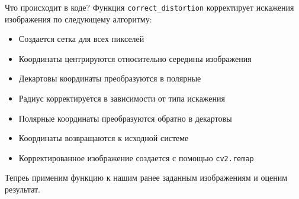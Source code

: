 \documentclass[a4paper,12pt]{article}
\begin{document}
Что происходит в коде? Функция \texttt{correct\_distortion} корректирует искажения изображения по следующему алгоритму:

\begin{itemize}
    \item Создается сетка для всех пикселей
    \item Координаты центрируются относительно середины изображения
    \item Декартовы координаты преобразуются в полярные
    \item Радиус корректируется в зависимости от типа искажения
    \item  Полярные координаты преобразуются обратно в декартовы
    \item Координаты возвращаются к исходной системе
    \item Корректированное изображение создается с помощью \texttt{cv2.remap}
\end{itemize}

Тепреь применим функцию к нашим ранее заданным изображениям и оценим результат.
\end{document}
